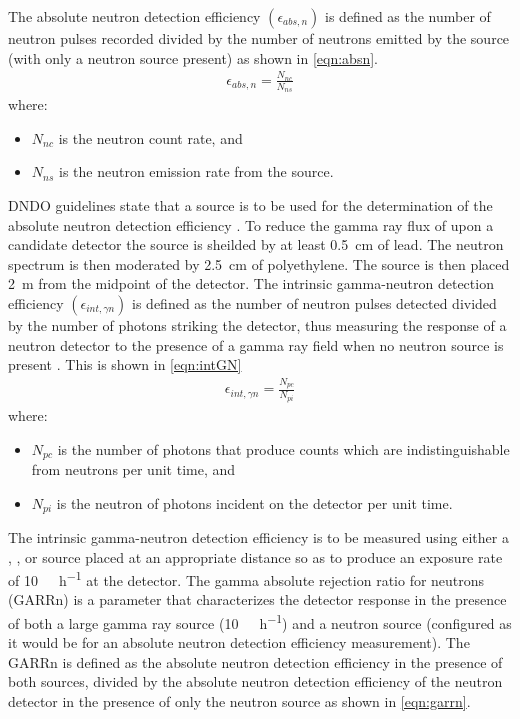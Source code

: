 \documentclass[draftcls,onecolumn]{IEEEtran}
\begin{document}
The absolute neutron detection efficiency $\left (\epsilon_{abs,n} \right )$ is defined as the number of neutron pulses recorded divided by the number of neutrons emitted by the source (with only a neutron source present) as shown in \eqref{eqn:absn}.
\begin{align}
	\label{eqn:absn}
  \epsilon_{abs,n} = \frac{N_{nc}}{N_{ns}}
\end{align}
where:
\begin{itemize}
 \item[] $N_{nc}$ is the neutron count rate, and
 \item[] $N_{ns}$ is the neutron emission rate from the source.
\end{itemize}
DNDO guidelines state that a  source is to be used for the determination of the absolute neutron detection efficiency \cite{pnnl_18471}.
To reduce the gamma ray flux of  upon a candidate detector the source is sheilded by at least \SI{0.5}{\cm} of lead\cite{pnnl_18471}.
The neutron spectrum is then moderated by \SI{2.5}{\cm} of polyethylene\cite{pnnl_18471}.
The source is then placed \SI{2}{\meter} from the midpoint of the detector.
The intrinsic gamma-neutron detection efficiency $\left(\epsilon_{int,\gamma n}\right)$  is defined as the number of neutron pulses detected divided by the number of photons striking the detector, thus measuring the response of a neutron detector to the presence of a gamma ray field when no neutron source is present .
This is shown in \eqref{eqn:intGN}
\begin{align}
  \label{eqn:intGN}
  \epsilon_{int,\gamma n} = \frac{N_{pc}}{N_{pi}}
\end{align}
where:
\begin{itemize}
 \item[] $N_{pc}$ is the number of photons that produce counts which are indistinguishable from neutrons per unit time, and 
 \item[] $N_{pi}$ is the neutron of photons incident on the detector per unit time.
\end{itemize}
The intrinsic gamma-neutron detection efficiency is to be measured using either a , , or  source placed at an appropriate distance so as to produce an exposure rate of \SI{10}{\milli\roetgen\per\hour} at the detector\cite{kouzes_neutron_1999}.
The gamma absolute rejection ratio for neutrons (GARRn) is a parameter that characterizes the detector response in the presence of both a large gamma ray source (\SI{10}{\milli\roetgen\per\hour}) and a  neutron source (configured as it would be for an absolute neutron detection efficiency measurement).
The GARRn is defined as the absolute neutron detection efficiency in the presence of both sources, divided by the absolute neutron detection efficiency of the neutron detector in the presence of only the neutron source as shown in \eqref{eqn:garrn}\cite{kouzes_neutron_1999}.
\end{document}

